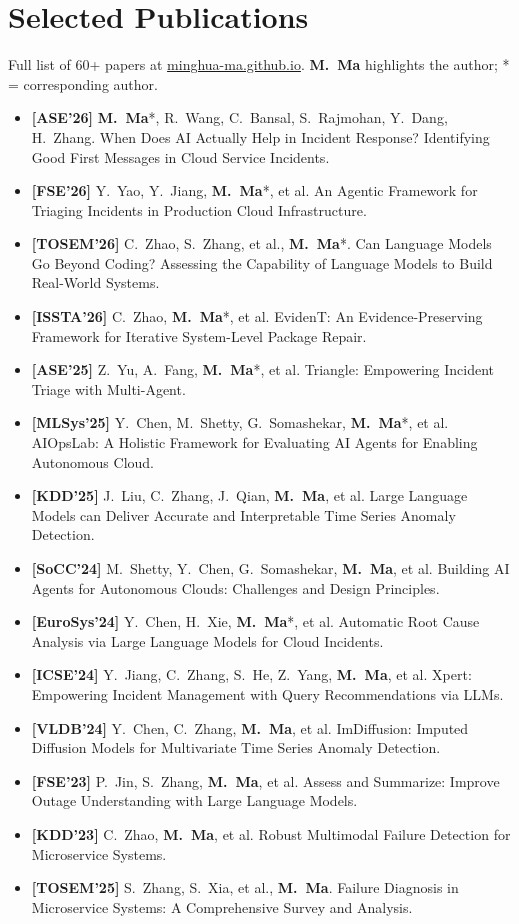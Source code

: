 \documentclass[10pt,letterpaper]{article}
\newcommand{\pub}[3]{\item {\color{accent}\textbf{[#3'#2]}}\; #1.}
\begin{document}
\section{Selected Publications}
\vspace{-0.2ex}
{\small Full list of 60+ papers at \href{https://minghua-ma.github.io/\#publications}{minghua-ma.github.io}. \; \textbf{M.\ Ma} highlights the author; * = corresponding author.}
\vspace{0.4ex}
\begin{itemize}[leftmargin=1.6em, label={}, itemsep=0.35ex]
  \pub{\textbf{M.\ Ma}*, R.\ Wang, C.\ Bansal, S.\ Rajmohan, Y.\ Dang, H.\ Zhang. When Does AI Actually Help in Incident Response? Identifying Good First Messages in Cloud Service Incidents}{26}{ASE}
  \pub{Y.\ Yao, Y.\ Jiang, \textbf{M.\ Ma}*, et al. An Agentic Framework for Triaging Incidents in Production Cloud Infrastructure}{26}{FSE}
  \pub{C.\ Zhao, S.\ Zhang, et al., \textbf{M.\ Ma}*. Can Language Models Go Beyond Coding? Assessing the Capability of Language Models to Build Real-World Systems}{26}{TOSEM}
  \pub{C.\ Zhao, \textbf{M.\ Ma}*, et al. EvidenT: An Evidence-Preserving Framework for Iterative System-Level Package Repair}{26}{ISSTA}
  \pub{Z.\ Yu, A.\ Fang, \textbf{M.\ Ma}*, et al. Triangle: Empowering Incident Triage with Multi-Agent}{25}{ASE}
  \pub{Y.\ Chen, M.\ Shetty, G.\ Somashekar, \textbf{M.\ Ma}*, et al. AIOpsLab: A Holistic Framework for Evaluating AI Agents for Enabling Autonomous Cloud}{25}{MLSys}
  \pub{J.\ Liu, C.\ Zhang, J.\ Qian, \textbf{M.\ Ma}, et al. Large Language Models can Deliver Accurate and Interpretable Time Series Anomaly Detection}{25}{KDD}
  \pub{M.\ Shetty, Y.\ Chen, G.\ Somashekar, \textbf{M.\ Ma}, et al. Building AI Agents for Autonomous Clouds: Challenges and Design Principles}{24}{SoCC}
  \pub{Y.\ Chen, H.\ Xie, \textbf{M.\ Ma}*, et al. Automatic Root Cause Analysis via Large Language Models for Cloud Incidents}{24}{EuroSys}
  \pub{Y.\ Jiang, C.\ Zhang, S.\ He, Z.\ Yang, \textbf{M.\ Ma}, et al. Xpert: Empowering Incident Management with Query Recommendations via LLMs}{24}{ICSE}
  \pub{Y.\ Chen, C.\ Zhang, \textbf{M.\ Ma}, et al. ImDiffusion: Imputed Diffusion Models for Multivariate Time Series Anomaly Detection}{24}{VLDB}
  \pub{P.\ Jin, S.\ Zhang, \textbf{M.\ Ma}, et al. Assess and Summarize: Improve Outage Understanding with Large Language Models}{23}{FSE}
  \pub{C.\ Zhao, \textbf{M.\ Ma}, et al. Robust Multimodal Failure Detection for Microservice Systems}{23}{KDD}
  \pub{S.\ Zhang, S.\ Xia, et al., \textbf{M.\ Ma}. Failure Diagnosis in Microservice Systems: A Comprehensive Survey and Analysis}{25}{TOSEM}

\end{itemize}
\end{document}

